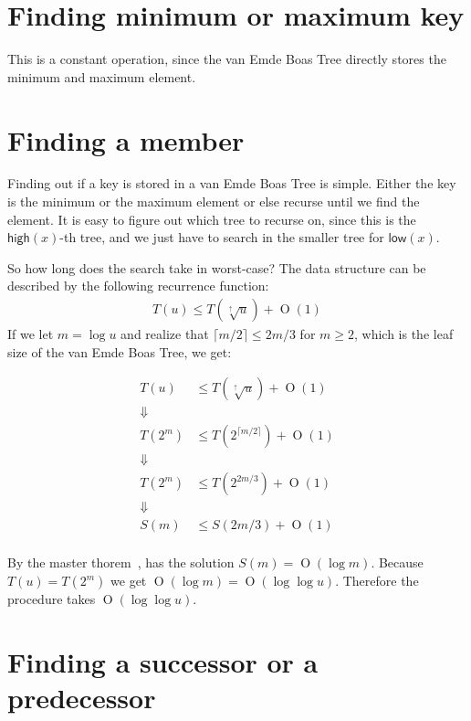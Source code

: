 \documentclass[oneside,11pt,openright]{report}
\newcommand{\BigO}[1]{\ensuremath{\operatorname{O}\left(#1\right)}}
\newcommand{\HIGH}{\textsf{high}}
\newcommand{\LOW}{\textsf{low}}
\newcommand{\HIGHER}{\sqrt[\uparrow]{u}}
\begin{document}
\section{Finding minimum or maximum key}

This is  a constant operation, since  the van Emde Boas  Tree directly
stores the minimum and maximum element.

\section{Finding a member}

Finding  out  if  a  key  is  stored  in  a  van  Emde  Boas  Tree  is
simple. Either the  key is the minimum or the  maximum element or else
recurse until we find the element. It is easy to figure out which tree
to recurse on, since this is  the $\HIGH(x)$-th tree, and we just have
to search in the smaller tree for $\LOW(x)$.

So how long does the search take in worst-case? The data structure can
be described by the following recurrence function:
\begin{align*}
    T(u) \leq T(\HIGHER) + \BigO{1}
\end{align*}
If we let $m = \log  u$ and realize that $\lceil{m/2}\rceil \leq 2m/3$
for $m \geq 2$,  which is the leaf size of the van  Emde Boas Tree, we
get:

\begin{align*}
    T(u)  & \leq T(\HIGHER) + \BigO{1} \\
    \Downarrow \\
    T(2^m) & \leq T(2^{\lceil{m/2}\rceil}) + \BigO{1} \\
    \Downarrow \\
    T(2^m) & \leq T(2^{2m/3}) + \BigO{1} \\
    \Downarrow \\
    S(m) & \leq S(2m/3) + \BigO{1} \\
\end{align*}

By the  master thorem~\cite[p.  93]{ITA09}, has  the solution  $S(m) =
\BigO{\log  m}$. Because  $T(u)  =  T(2^m)$ we  get  $\BigO{\log m}  =
\BigO{\log \log  u}$. Therefore  the procedure takes  $\BigO{\log \log
  u}$.

\section{Finding a successor or a predecessor}
\end{document}
